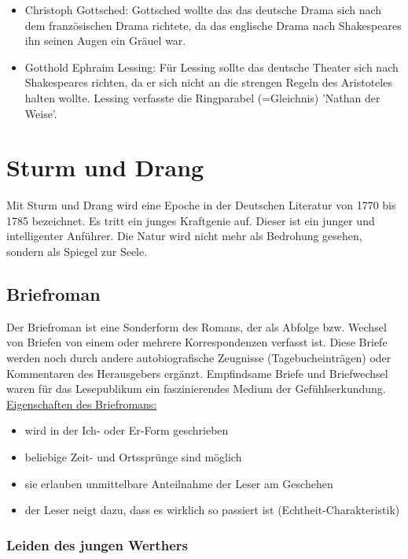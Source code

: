 \documentclass[12pt,a4paper]{article}
\begin{document}
\begin{itemize}
\item Christoph Gottsched: Gottsched wollte das das deutsche Drama sich nach dem französischen Drama richtete, da das englische Drama nach Shakespeares ihn seinen Augen ein Gräuel war. 

\item Gotthold Ephraim Lessing: Für Lessing sollte das deutsche Theater sich nach Shakespeares richten, da er sich nicht an die strengen Regeln des Aristoteles halten wollte. Lessing verfasste die Ringparabel (=Gleichnis) 'Nathan der Weise'.
\end{itemize}

\newpage

\section{Sturm und Drang}

Mit Sturm und Drang wird eine Epoche in der Deutschen Literatur von 1770 bis 1785 bezeichnet. Es tritt ein junges Kraftgenie auf. Dieser ist ein junger und intelligenter Anführer. Die Natur wird nicht mehr als Bedrohung gesehen, sondern als Spiegel zur Seele.

\subsection{Briefroman}

Der Briefroman ist eine Sonderform des Romans, der als Abfolge bzw. Wechsel von Briefen von einem oder mehrere Korrespondenzen verfasst ist. Diese Briefe werden noch durch andere autobiografische Zeugnisse (Tagebucheinträgen) oder Kommentaren des Herausgebers ergänzt. Empfindsame Briefe und Briefwechsel waren für das Lesepublikum ein faszinierendes Medium der Gefühlserkundung.\\
\underline{Eigenschaften des Briefromans:}

\begin{itemize}
\item wird in der Ich- oder Er-Form geschrieben
\item beliebige Zeit- und Ortssprünge sind möglich
\item sie erlauben unmittelbare Anteilnahme der Leser am Geschehen
\item der Leser neigt dazu, dass es wirklich so passiert ist (Echtheit-Charakteristik)
\end{itemize}

\subsubsection{Leiden des jungen Werthers}
\end{document}
